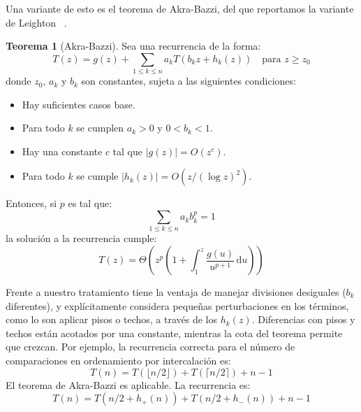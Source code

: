 \documentclass[english, spanish, fleqn, 10pt]{article}
\numberwithin{equation}{section}
\theoremstyle{definition}
\newtheorem{teorema}{Teorema}[section]
\begin{document}
  Una variante de esto es el teorema de Akra-Bazzi,
  del que reportamos la variante de Leighton~%
    \cite{leighton96:_notes_better_master_theo}.
  \begin{teorema}[Akra-Bazzi]
    \label{theo:Akra-Bazzi}
    Sea una recurrencia de la forma:
    \begin{equation*}
      T(z)
	= g(z) + \sum_{1 \le k \le n} a_k T(b_k z + h_k(z))
	   \quad \text{para \(z \ge z_0\)}
    \end{equation*}
    donde \(z_0\), \(a_k\) y \(b_k\) son constantes,
    sujeta a las siguientes condiciones:
    \begin{itemize}
    \item
      Hay suficientes casos base.
    \item
      Para todo \(k\) se cumplen \(a_k > 0\) y \(0 < b_k < 1\).
    \item
      Hay una constante \(c\)
      tal que \(\lvert g(z) \rvert = O(z^c)\).
    \item
      Para todo \(k\)
      se cumple \(\lvert h_k(z) \rvert = O(z / (\log z)^2)\).
    \end{itemize}
    Entonces,
    si \(p\) es tal que:
    \begin{equation*}
      \sum_{1 \le k \le n} a_k b_k^p
	= 1
    \end{equation*}
    la solución a la recurrencia cumple:
    \begin{equation*}
      T(z)
	= \Theta
	    \left(
	      z^p \left(
		     1 + \int_1^z \frac{g(u)}{u^{p + 1}}
			   \, \mathrm{d} u
		  \right)
	    \right)
    \end{equation*}
  \end{teorema}
  Frente a nuestro tratamiento tiene la ventaja
  de manejar divisiones desiguales
  (\(b_k\) diferentes),
  y explícitamente
  considera pequeñas perturbaciones en los términos,
  como lo son aplicar pisos o techos,
  a través de los \(h_k(z)\).
  Diferencias con pisos y techos están acotados por una constante,
  mientras la cota del teorema permite que crezcan.
  Por ejemplo,
  la recurrencia correcta para el número de comparaciones
  en ordenamiento por intercalación es:
  \begin{equation*}
    T(n)
      = T(\lfloor n / 2 \rfloor) + T(\lceil n / 2 \rceil) + n - 1
  \end{equation*}
  El teorema de Akra-Bazzi es aplicable.
  La recurrencia es:
  \begin{equation*}
    T(n)
      = T(n / 2 + h_{+}(n)) + T(n / 2 + h_{-}(n)) + n - 1
  \end{equation*}
\end{document}

